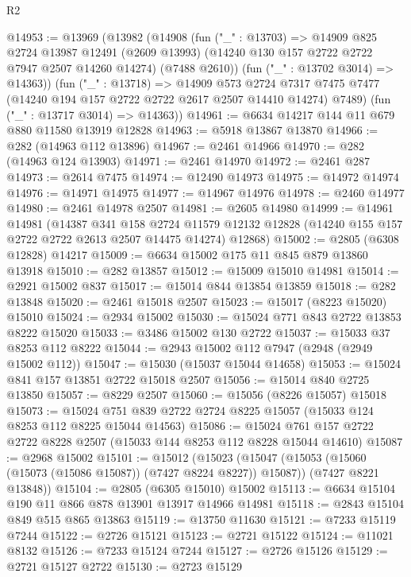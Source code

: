 \begin{lexlean}{R2}
\begin{coremodule}
@14953 := @13969
    (@13982
      (@14908
        (fun ("_" : @13703) =>
        @14909
          @825
          @2724
          @13987
          @12491
          (@2609 @13993)
          (@14240 @130 @157 @2722 @2722 @7947 @2507 @14260 @14274)
          (@7488 @2610))
        (fun ("_" : @13702 @3014) => @14363))
      (fun ("_" : @13718) =>
      @14909
        @573
        @2724
        @7317
        @7475
        @7477
        (@14240 @194 @157 @2722 @2722 @2617 @2507 @14410 @14274)
        @7489)
      (fun ("_" : @13717 @3014) => @14363))
@14961 := @6634 @14217 @144 @11 @679 @880 @11580 @13919 @12828
@14963 := @5918 @13867 @13870
@14966 := @282 (@14963 @112 @13896)
@14967 := @2461 @14966
@14970 := @282 (@14963 @124 @13903)
@14971 := @2461 @14970
@14972 := @2461 @287
@14973 := @2614 @7475
@14974 := @12490 @14973
@14975 := @14972 @14974
@14976 := @14971 @14975
@14977 := @14967 @14976
@14978 := @2460 @14977
@14980 := @2461 @14978 @2507
@14981 := @2605 @14980
@14999 := @14961
    @14981
    (@14387
      @341
      @158
      @2724
      @11579
      @12132
      @12828
      (@14240 @155 @157 @2722 @2722 @2613 @2507 @14475 @14274)
      @12868)
@15002 := @2805 (@6308 @12828) @14217
@15009 := @6634 @15002 @175 @11 @845 @879 @13860 @13918
@15010 := @282 @13857
@15012 := @15009 @15010 @14981
@15014 := @2921 @15002 @837
@15017 := @15014 @844 @13854 @13859
@15018 := @282 @13848
@15020 := @2461 @15018 @2507
@15023 := @15017 (@8223 @15020) @15010
@15024 := @2934 @15002
@15030 := @15024 @771 @843 @2722 @13853 @8222 @15020
@15033 := @3486 @15002 @130 @2722
@15037 := @15033 @37 @8253 @112 @8222
@15044 := @2943 @15002 @112 @7947 (@2948 (@2949 @15002 @112))
@15047 := @15030 (@15037 @15044 @14658)
@15053 := @15024 @841 @157 @13851 @2722 @15018 @2507
@15056 := @15014 @840 @2725 @13850
@15057 := @8229 @2507
@15060 := @15056 (@8226 @15057) @15018
@15073 := @15024 @751 @839 @2722 @2724 @8225 @15057 (@15033 @124 @8253 @112 @8225 @15044 @14563)
@15086 := @15024 @761 @157 @2722 @2722 @8228 @2507 (@15033 @144 @8253 @112 @8228 @15044 @14610)
@15087 := @2968 @15002
@15101 := @15012
    (@15023
      (@15047 (@15053 (@15060 (@15073 (@15086 @15087)) (@7427 @8224 @8227)) @15087))
      (@7427 @8221 @13848))
@15104 := @2805 (@6305 @15010) @15002
@15113 := @6634 @15104 @190 @11 @866 @878 @13901 @13917 @14966 @14981
@15118 := @2843 @15104 @849 @515 @865 @13863
@15119 := @13750 @11630
@15121 := @7233 @15119 @7244
@15122 := @2726 @15121
@15123 := @2721 @15122
@15124 := @11021 @8132
@15126 := @7233 @15124 @7244
@15127 := @2726 @15126
@15129 := @2721 @15127 @2722
@15130 := @2723 @15129

\end{coremodule}
\end{lexlean}
